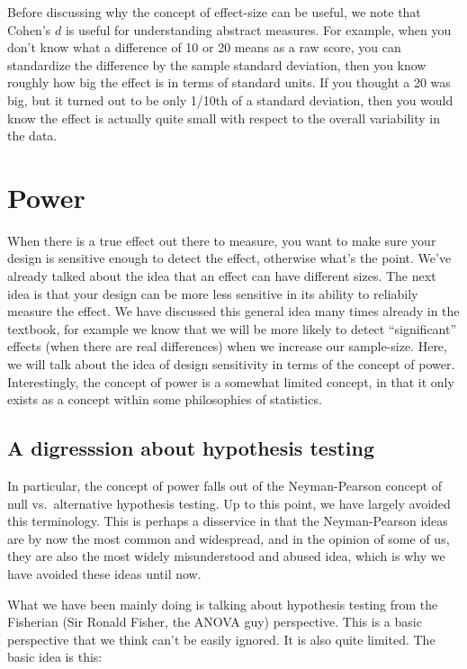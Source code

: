\documentclass[
]{book}
\begin{document}
Before discussing why the concept of effect-size can be useful, we note that Cohen's \(d\) is useful for understanding abstract measures. For example, when you don't know what a difference of 10 or 20 means as a raw score, you can standardize the difference by the sample standard deviation, then you know roughly how big the effect is in terms of standard units. If you thought a 20 was big, but it turned out to be only 1/10th of a standard deviation, then you would know the effect is actually quite small with respect to the overall variability in the data.

\hypertarget{power}{%
\section{Power}\label{power}}

When there is a true effect out there to measure, you want to make sure your design is sensitive enough to detect the effect, otherwise what's the point. We've already talked about the idea that an effect can have different sizes. The next idea is that your design can be more less sensitive in its ability to reliabily measure the effect. We have discussed this general idea many times already in the textbook, for example we know that we will be more likely to detect ``significant'' effects (when there are real differences) when we increase our sample-size. Here, we will talk about the idea of design sensitivity in terms of the concept of power. Interestingly, the concept of power is a somewhat limited concept, in that it only exists as a concept within some philosophies of statistics.

\hypertarget{a-digresssion-about-hypothesis-testing}{%
\subsection{A digresssion about hypothesis testing}\label{a-digresssion-about-hypothesis-testing}}

In particular, the concept of power falls out of the Neyman-Pearson concept of null vs.~alternative hypothesis testing. Up to this point, we have largely avoided this terminology. This is perhaps a disservice in that the Neyman-Pearson ideas are by now the most common and widespread, and in the opinion of some of us, they are also the most widely misunderstood and abused idea, which is why we have avoided these ideas until now.

What we have been mainly doing is talking about hypothesis testing from the Fisherian (Sir Ronald Fisher, the ANOVA guy) perspective. This is a basic perspective that we think can't be easily ignored. It is also quite limited. The basic idea is this:
\end{document}
